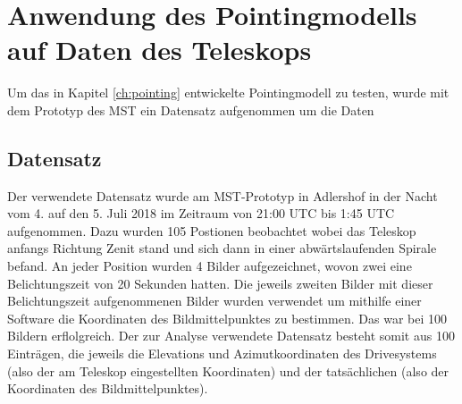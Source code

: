 \chapter{Anwendung des Pointingmodells auf Daten des Teleskops}
\label{ch:auswertung}
Um das in Kapitel \ref{ch:pointing} entwickelte Pointingmodell zu testen, wurde mit dem Prototyp des MST ein Datensatz aufgenommen um die Daten
\section{Datensatz}
Der verwendete Datensatz wurde am MST-Prototyp in Adlershof in der Nacht vom 4. auf den 5. Juli 2018 im Zeitraum von 21:00 UTC bis 1:45 UTC aufgenommen. Dazu wurden 105 Postionen beobachtet wobei das Teleskop anfangs Richtung Zenit stand und sich dann in einer abwärtslaufenden Spirale befand. An jeder Position wurden 4 Bilder aufgezeichnet, wovon zwei eine Belichtungszeit von 20 Sekunden hatten. Die jeweils zweiten Bilder mit dieser Belichtungszeit aufgenommenen Bilder wurden verwendet um mithilfe einer Software die Koordinaten des Bildmittelpunktes zu bestimmen. Das war bei 100 Bildern erflolgreich. Der zur Analyse verwendete Datensatz besteht somit aus 100 Einträgen, die jeweils die Elevations und Azimutkoordinaten des Drivesystems (also der am Teleskop eingestellten Koordinaten) und der tatsächlichen (also der Koordinaten des Bildmittelpunktes).
